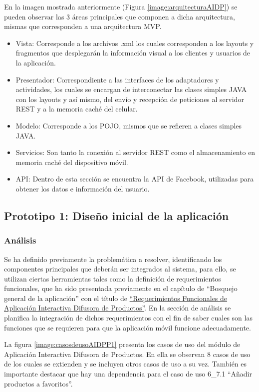En la imagen mostrada anteriormente (Figura \ref{image:arquitecturaAIDP}) se pueden observar las 3 áreas principales que componen a dicha arquitectura, mismas que corresponden a una arquitectura MVP.
\begin{itemize}
\item Vista: Corresponde a los archivos .xml los cuales corresponden a los layouts y fragmentos que desplegarán la información visual a los clientes y usuarios de la aplicación.
\item Presentador: Correspondiente a las interfaces de los adaptadores y actividades, los cuales se encargan de interconectar las clases simples JAVA con los layouts y así mismo, del envío y recepción de peticiones al servidor REST y a la memoria caché del celular.
\item Modelo: Corresponde a los POJO, mismos que se refieren a clases simples JAVA.
\item  Servicios: Son tanto la conexión al servidor REST como el almacenamiento en memoria caché del dispositivo móvil.
\item API: Dentro de esta sección se encuentra la API de Facebook, utilizadas para obtener los datos e información del usuario.
\end{itemize}
\subsection{Prototipo 1: Diseño inicial de la aplicación}
\hypertarget{Prototipo1}{}
\subsubsection{Análisis}
Se ha definido previamente la problemática a resolver, identificando los componentes principales que deberán ser integrados al sistema, \cite{Etapas} para ello, se utilizan ciertas herramientas tales como la definición de requerimientos funcionales, que ha sido presentada previamente en el capítulo de ``Bosquejo general de la aplicación'' con el título de \hyperlink{RFAIDP}{``Requerimientos Funcionales de Aplicación Interactiva Difusora de Productos''}. En la sección de análisis se planifica la integración de dichos requerimientos con el fin de saber cuales son las funciones que se requieren para que la aplicación móvil funcione adecuadamente. 
\\ \par 
La figura \ref{image:casosdeusoAIDPP1} presenta los casos de uso del módulo de Aplicación Interactiva Difusora de Productos. En ella se observan 8 casos de uso de los cuales se extienden y se incluyen otros casos de uso a su vez. También es importante destacar que hay una dependencia para el caso de uso 6\_7.1 ``Añadir productos a favoritos''.
\\ \par


